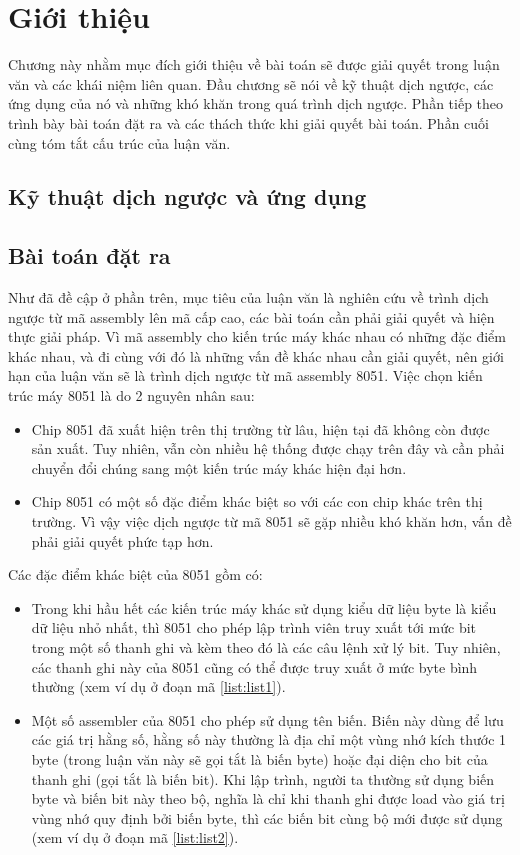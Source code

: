 \section{Giới thiệu}
\label{sec:gioithieu}


Chương này nhằm mục đích giới thiệu về bài toán sẽ được giải quyết trong luận văn và các khái niệm liên quan. Đầu chương sẽ nói về kỹ thuật dịch ngược, các ứng dụng của nó và những khó khăn trong quá trình dịch ngược. Phần tiếp theo trình bày bài toán đặt ra và các thách thức khi giải quyết bài toán. Phần cuối cùng tóm tắt cấu trúc của luận văn.

\subsection{Kỹ thuật dịch ngược và ứng dụng}
\subsection{Bài toán đặt ra}

Như đã đề cập ở phần trên, mục tiêu của luận văn là nghiên cứu về trình dịch ngược từ mã assembly lên mã cấp cao, các bài toán cần phải giải quyết và hiện thực giải pháp. Vì mã assembly cho kiến trúc máy khác nhau có những đặc điểm khác nhau, và đi cùng với đó là những vấn đề khác nhau cần giải quyết, nên giới hạn của luận văn sẽ là trình dịch ngược từ mã assembly 8051. Việc chọn kiến trúc máy 8051 là do 2 nguyên nhân sau:
\begin{itemize}
	\item Chip 8051 đã xuất hiện trên thị trường từ lâu, hiện tại đã không còn được sản xuất. Tuy nhiên, vẫn còn nhiều hệ thống được chạy trên đây và cần phải chuyển đổi chúng sang một kiến trúc máy khác hiện đại hơn.
	\item Chip 8051 có một số đặc điểm khác biệt so với các con chip khác trên thị trường. Vì vậy việc dịch ngược từ mã 8051 sẽ gặp nhiều khó khăn hơn, vấn đề phải giải quyết phức tạp hơn. 
\end{itemize}

Các đặc điểm khác biệt của 8051 gồm có:
\begin{itemize}
	\item Trong khi hầu hết các kiến trúc máy khác sử dụng kiểu dữ liệu byte là kiểu dữ liệu nhỏ nhất, thì 8051 cho phép lập trình viên truy xuất tới mức bit trong một số thanh ghi và kèm theo đó là các câu lệnh xử lý bit. Tuy nhiên, các thanh ghi này của 8051 cũng có thể được truy xuất ở mức byte bình thường (xem ví dụ ở đoạn mã \ref{list:list1}).
	\item Một số assembler của 8051 cho phép sử dụng tên biến. Biến này dùng để lưu các giá trị hằng số, hằng số này thường là địa chỉ một vùng nhớ kích thước 1 byte (trong luận văn này sẽ gọi tắt là biến byte) hoặc đại diện cho bit của thanh ghi (gọi tắt là biến bit). Khi lập trình, người ta thường sử dụng biến byte và biến bit này theo bộ, nghĩa là chỉ khi thanh ghi được load vào giá trị vùng nhớ quy định bởi biến byte, thì các biến bit cùng bộ mới được sử dụng (xem ví dụ ở đoạn mã \ref{list:list2}).
\end{itemize}

